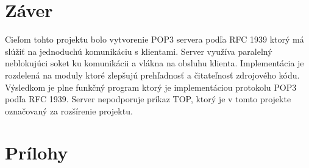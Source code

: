 \documentclass[11pt,a4paper]{article}
\begin{document}
\section{Záver}

\indent Cieľom tohto projektu bolo vytvorenie POP3 servera podľa RFC 1939\cite{POP3} ktorý má slúžiť na jednoduchú komunikáciu s klientami. Server využíva paralelný neblokujúci soket ku komunikácii a vlákna na obsluhu klienta. Implementácia je rozdelená na moduly ktoré zlepšujú prehľadnosť a čitateľnosť zdrojového kódu.\\[0.4em]
\indent Výsledkom je plne funkčný program ktorý je implementáciou protokolu POP3 podľa RFC 1939\cite{POP3}. Server nepodporuje príkaz TOP, ktorý je v tomto projekte označovaný za rozšírenie projektu.


\newpage %

\section{Prílohy}
\end{document}
